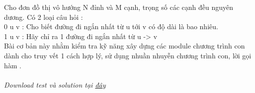 Cho đơn đồ thị vô hướng N đỉnh và M cạnh, trọng số các cạnh đều nguyên dương. Có 2 loại câu hỏi :   
\\   0 u v : Cho biết đường đi ngắn nhất từ u tới v có độ dài là bao nhiêu.   
\\   1 u v : Hãy chỉ ra 1 đường đi ngắn nhất từ u -> v   
\\   Bài cơ bản này nhằm kiểm tra kỹ năng xây dựng các module chương trình con dành cho truy vết 1 cách hợp lý, sử dụng nhuần nhuyễn chương trình con, lời gọi hàm .   
\\
\\\textit{    Download test và solution tại    \href{http://vn.spoj.pl/content/floyd.rar}{     đây    }}